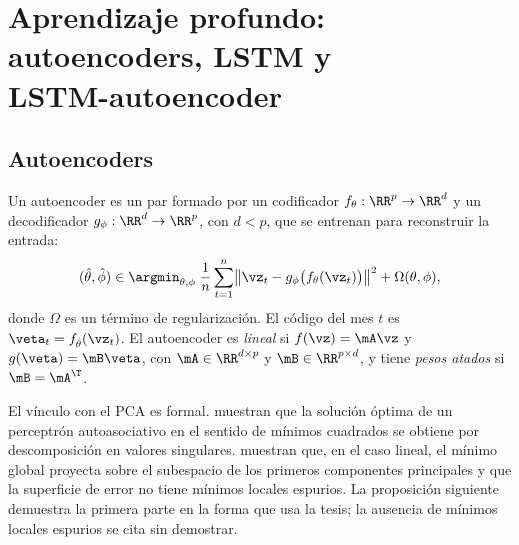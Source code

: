 \section[Aprendizaje profundo]{Aprendizaje profundo: autoencoders, LSTM y\texorpdfstring{\\}{} LSTM-autoencoder}
\label{sec:dl}

\subsection{Autoencoders}

\begin{definicion}[Autoencoder]\label{def:ae}
Un autoencoder es un par formado por un codificador $f_\theta:\RR^p\to\RR^d$ y un decodificador
$g_\phi:\RR^d\to\RR^p$, con $d<p$, que se entrenan para reconstruir la entrada:
\begin{equation}\label{eq:ae}
  (\hat\theta,\hat\phi)\in\argmin_{\theta,\phi}\;\frac1n\sum_{t=1}^{n}
  \bigl\lVert\vz_t-g_\phi\bigl(f_\theta(\vz_t)\bigr)\bigr\rVert^2+\Omega(\theta,\phi),
\end{equation}
donde $\Omega$ es un término de regularización. El código del mes $t$ es
$\veta_t=f_{\hat\theta}(\vz_t)$. El autoencoder es \emph{lineal} si $f(\vz)=\mA\vz$ y
$g(\veta)=\mB\veta$, con $\mA\in\RR^{d\times p}$ y $\mB\in\RR^{p\times d}$, y tiene \emph{pesos
atados} si $\mB=\mA^{\T}$.
\end{definicion}

El vínculo con el PCA es formal. \textcite{bourlard_kamp_1988} muestran que la solución
óptima de un perceptrón autoasociativo en el sentido de mínimos cuadrados se obtiene por
descomposición en valores singulares. \textcite{baldi_hornik_1989} muestran que, en el caso lineal,
el mínimo global proyecta sobre el subespacio de los primeros componentes principales y que la
superficie de error no tiene mínimos locales espurios. La proposición siguiente demuestra la
primera parte en la forma que usa la tesis; la ausencia de mínimos locales espurios se cita sin
demostrar.


